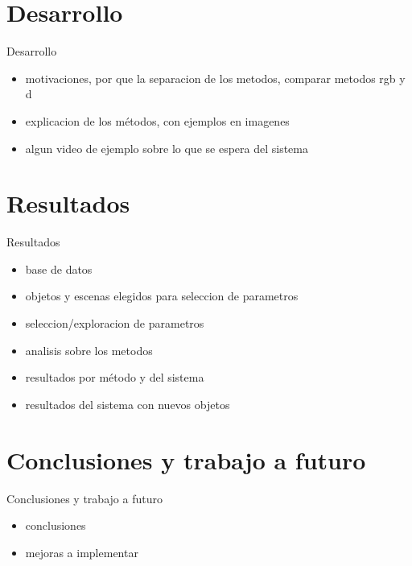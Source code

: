 \documentclass[]{beamer}
\begin{document}
\section{Desarrollo}
\begin{frame}{Desarrollo}
    \begin{itemize}
        \item motivaciones, por que la separacion de los metodos, comparar metodos rgb y d
        \item explicacion de los métodos, con ejemplos en imagenes
        \item algun video de ejemplo sobre lo que se espera del sistema
    \end{itemize}

\end{frame}


\section{Resultados}
\begin{frame}{Resultados}
    \begin{itemize}
        \item base de datos
        \item objetos y escenas elegidos para seleccion de parametros
        \item seleccion/exploracion de parametros
        \item analisis sobre los metodos
        \item resultados por método y del sistema
        \item resultados del sistema con nuevos objetos
    \end{itemize}
\end{frame}

\section{Conclusiones y trabajo a futuro}
\begin{frame}{Conclusiones y trabajo a futuro}
    \begin{itemize}
        \item conclusiones
        \item mejoras a implementar
    \end{itemize}
\end{frame}
\end{document}
